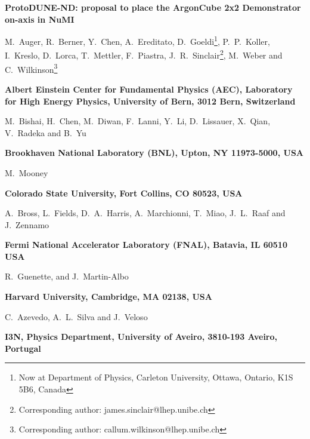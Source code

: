 \documentclass[a4paper]{article}
\begin{document}
\begin{center}
		
	{\Large \bf ProtoDUNE-ND: proposal to place the ArgonCube 2x2 Demonstrator on-axis in NuMI} 
	\vspace*{0.5cm}
	\setcounter{footnote}{0}  
	\def\A{\kern+.6ex\lower.42ex\hbox{$\scriptstyle \iota$}\kern-1.20ex a}
	\def\E{\kern+.5ex\lower.42ex\hbox{$\scriptstyle \iota$}\kern-1.10ex e}
	\small
	\newcommand{\Aname}[2]{#1}
	\def\titlefoot#1{\vspace{-0.3cm}\begin{center}{\bf #1}\end{center}}
	
	\Aname{M.~Auger}{Bern},
	\Aname{R.~Berner}{Bern},
	\Aname{Y.~Chen}{Bern},
	\Aname{A.~Ereditato}{Bern},
	\Aname{D.~Goeldi\footnote{Now at Department of Physics, Carleton University, Ottawa, Ontario, K1S 5B6, Canada}}{Bern},
	\Aname{P.~P.~Koller}{Bern},
	\Aname{I.~Kreslo}{Bern},
	\Aname{D.~Lorca}{Bern},
	\Aname{T.~Mettler}{Bern},
	\Aname{F.~Piastra}{Bern},
	\Aname{J.~R.~Sinclair\footnote{Corresponding author: james.sinclair@lhep.unibe.ch}}{Bern},
	\Aname{M.~Weber}{Bern} and
	\Aname{C.~Wilkinson\footnote{Corresponding author: callum.wilkinson@lhep.unibe.ch}}{Bern}
	\titlefoot{Albert Einstein Center for Fundamental Physics (AEC), Laboratory for High Energy Physics, University of Bern, 3012 Bern, Switzerland\label{Bern}}
	
	\Aname{M.~Bishai}{BNL},
	\Aname{H.~Chen}{BNL},
	\Aname{M.~Diwan}{BNL},
	\Aname{F.~Lanni}{BNL},
	\Aname{Y.~Li}{BNL},
	\Aname{D.~Lissauer}{BNL},
	\Aname{X.~Qian}{BNL},
	\Aname{V.~Radeka}{BNL} and
	\Aname{B.~Yu}{BNL}
	\titlefoot{Brookhaven National Laboratory (BNL), Upton, NY 11973-5000, USA\label{BNL}}
	
	\Aname{M.~Mooney}{Colorado}
	\titlefoot{Colorado State University, Fort Collins, CO 80523, USA\label{colorado}}
	
	\Aname{A.~Bross}{FNAL},
	\Aname{L.~Fields}{FNAL},
	\Aname{D.~A.~Harris}{FNAL},
	\Aname{A.~Marchionni}{FNAL},
	\Aname{T.~Miao}{FNAL},
	\Aname{J.~L.~Raaf}{FNAL} and
	\Aname{J.~Zennamo}{FNAL}
	\titlefoot{Fermi National Accelerator Laboratory (FNAL), Batavia, IL 60510 USA\label{FNAL}}
	
	\Aname{R.~Guenette}{Harvard}, and
	\Aname{J.~Martin-Albo}{Harvard}
	\titlefoot{Harvard University, Cambridge, MA 02138, USA\label{Harvard}}
	
	\Aname{C.~Azevedo}{I3N},
	\Aname{A.~L.~Silva}{I3N} and
	\Aname{J.~Veloso}{I3N}
	\titlefoot{I3N, Physics Department, University of Aveiro, 3810-193 Aveiro, Portugal\label{I3N}}
	

\end{center}
\end{document}
